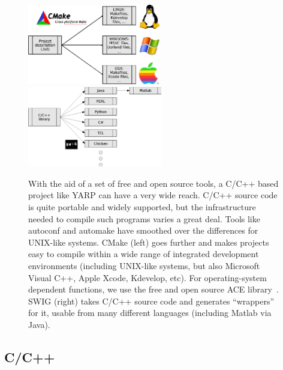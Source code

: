 \begin{figure}[t]
\begin{center}
\includegraphics[height=3.5cm]{fig-cmake}
\ \ \ \ \ \ 
\includegraphics[height=3.5cm]{fig-swig}
\caption{
%
\label{fig:build}
%
With the aid of a set of free and open source tools, 
a C/C++ based project like YARP can have a very
wide reach.
%
C/C++ source code is quite portable and widely supported, but the
infrastructure needed to compile such programs varies a great 
deal.  Tools like autoconf and automake have smoothed over
the differences for UNIX-like systems. CMake (left) goes
further and makes projects easy to compile within a
wide range of integrated development environments
(including UNIX-like systems, but also Microsoft Visual C++,
Apple Xcode, Kdevelop, etc).
%
For operating-system dependent functions, we use the free
and open source ACE library~\cite{ACEBook}.
%
SWIG (right) takes C/C++ source code and generates ``wrappers''
for it, usable from many different languages (including Matlab
via Java).
%
%
}
\end{center}
\end{figure}




\subsection{C/C++}

